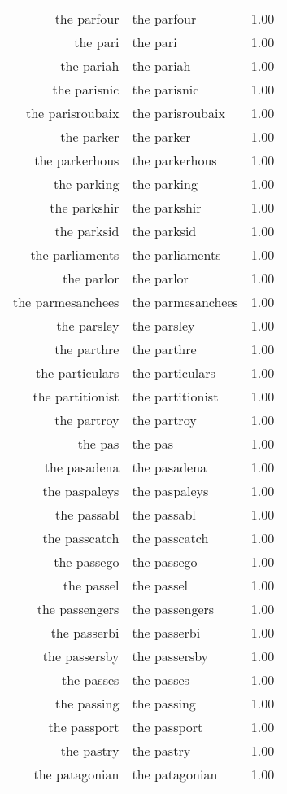 \begin{table}[ht]
\begin{tabular}{rlr}
  the parfour & the parfour & 1.00 \\ 
  the pari & the pari & 1.00 \\ 
  the pariah & the pariah & 1.00 \\ 
  the parisnic & the parisnic & 1.00 \\ 
  the parisroubaix & the parisroubaix & 1.00 \\ 
  the parker & the parker & 1.00 \\ 
  the parkerhous & the parkerhous & 1.00 \\ 
  the parking & the parking & 1.00 \\ 
  the parkshir & the parkshir & 1.00 \\ 
  the parksid & the parksid & 1.00 \\ 
  the parliaments & the parliaments & 1.00 \\ 
  the parlor & the parlor & 1.00 \\ 
  the parmesanchees & the parmesanchees & 1.00 \\ 
  the parsley & the parsley & 1.00 \\ 
  the parthre & the parthre & 1.00 \\ 
  the particulars & the particulars & 1.00 \\ 
  the partitionist & the partitionist & 1.00 \\ 
  the partroy & the partroy & 1.00 \\ 
  the pas & the pas & 1.00 \\ 
  the pasadena & the pasadena & 1.00 \\ 
  the paspaleys & the paspaleys & 1.00 \\ 
  the passabl & the passabl & 1.00 \\ 
  the passcatch & the passcatch & 1.00 \\ 
  the passego & the passego & 1.00 \\ 
  the passel & the passel & 1.00 \\ 
  the passengers & the passengers & 1.00 \\ 
  the passerbi & the passerbi & 1.00 \\ 
  the passersby & the passersby & 1.00 \\ 
  the passes & the passes & 1.00 \\ 
  the passing & the passing & 1.00 \\ 
  the passport & the passport & 1.00 \\ 
  the pastry & the pastry & 1.00 \\ 
  the patagonian & the patagonian & 1.00 \\ 

\end{tabular}
\end{table}

